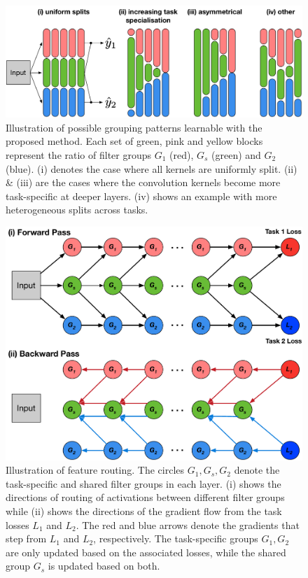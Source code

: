 \begin{figure}[ht]
	\center
	\includegraphics[width=0.9\linewidth]{chapter_6/figures/example_nets_03.pdf}
	\caption{\footnotesize Illustration of possible grouping patterns learnable with the proposed method. Each set of green, pink and yellow blocks represent the ratio of filter groups $G_1$ (red), $G_{s}$ (green) and $G_{2}$ (blue). (i) denotes the case where all kernels are uniformly split. (ii) \& (iii) are the cases where the convolution kernels become more task-specific at deeper layers. (iv) shows an example with more heterogeneous splits across tasks.}
    \label{fig:different_grouping}
\end{figure}

\begin{figure}[ht]
	\center
	\includegraphics[width=0.6\linewidth]{chapter_6/figures/forward_and_backward.pdf}
	\caption{\footnotesize Illustration of feature routing. The circles $G_{1}, G_{s}, G_{2}$ denote the task-specific and shared filter groups in each layer. (i) shows the directions of routing of activations between different filter groups while (ii) shows the directions of the gradient flow from the task losses $L_{1}$ and $L_{2}$. The red and blue arrows denote the gradients that step from $L_{1}$ and $L_{2}$, respectively. The task-specific groups $G_{1}, G_{2}$ are only updated based on the associated losses, while the shared group $G_{s}$ is updated based on both. }
    \label{fig:forward_and_backward}
\end{figure}


